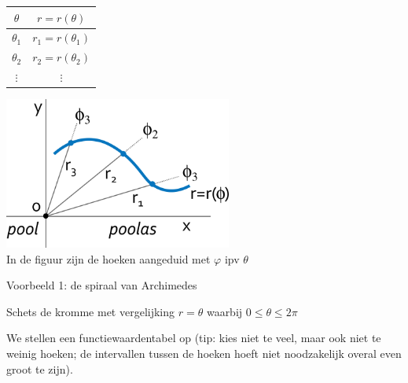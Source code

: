 \begin{minipage}{.48\linewidth}
	\centering
	\begin{tabular}{|c|c|}
		\hline 
		$\theta$ & $r=r(\theta)$\\
		\hline 
		\hline 
		$\theta_{1}$ & $r_{1}=r\left(\theta_{1}\right)$ \\
		\hline 
		$\theta_{2}$ & $r_{2}=r\left(\theta_{2}\right)$ \\
		\hline 
		$\vdots$ & $\vdots$\\
		\hline 
	\end{tabular}
\end{minipage}
\begin{minipage}{.48\linewidth}
\includegraphics[height=5cm]{2_elem_rekenvaardigheden_B/inputs/figuur11}\\
In de figuur zijn de hoeken aangeduid met $\varphi$ ipv $\theta$
\end{minipage}



Voorbeeld 1: de spiraal van Archimedes

Schets de kromme met vergelijking $r=\theta$ waarbij $0\leq\theta\leq2\pi$

We stellen een functiewaardentabel op (tip: kies niet te veel, maar
ook niet te weinig hoeken; de intervallen tussen de hoeken hoeft niet
noodzakelijk overal even groot te zijn).

